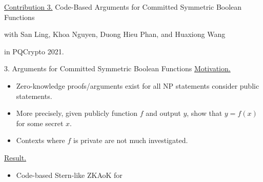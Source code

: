 \begin{frame}
	\underline{Contribution 3.} Code-Based Arguments for Committed Symmetric Boolean Functions
	
	{\small with San Ling, Khoa Nguyen, Duong Hieu Phan, and Huaxiong Wang}
	
	in PQCrypto 2021.
\end{frame}

\begin{frame}{3. Arguments for Committed Symmetric Boolean Functions}
	\underline{Motivation.} 
	\begin{itemize}
		\item Zero-knowledge proofs/arguments exist for all NP statements consider public statements.
		\item More precisely, given publicly function $f$ and output $y$, show that $y = f(x)$ for some secret $x$.
		\item Contexts where $f$ is private are not much investigated.
	\end{itemize}
	\underline{Result.}
	\begin{itemize}
		\item Code-based Stern-like ZKAoK for 
	\end{itemize}
\end{frame}